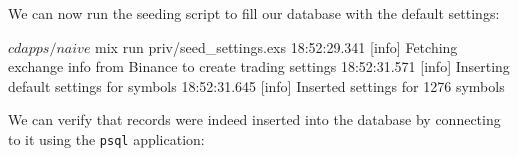 \documentclass[
]{book}
\newenvironment{Shaded}{\begin{snugshade}}{\end{snugshade}}
\newcommand{\ExtensionTok}[1]{#1}
\newcommand{\NormalTok}[1]{#1}
\begin{document}
We can now run the seeding script to fill our database with the default settings:

\begin{Shaded}
\begin{Highlighting}[]
\ExtensionTok{$}\NormalTok{ cd apps/naive}
\ExtensionTok{$}\NormalTok{ mix run priv/seed\_settings.exs}
\ExtensionTok{18:52:29.341}\NormalTok{ [info]  Fetching exchange info from Binance to create trading settings}
\ExtensionTok{18:52:31.571}\NormalTok{ [info]  Inserting default settings for symbols}
\ExtensionTok{18:52:31.645}\NormalTok{ [info]  Inserted settings for 1276 symbols}
\end{Highlighting}
\end{Shaded}

We can verify that records were indeed inserted into the database by connecting to it using the \texttt{psql} application:
\end{document}
